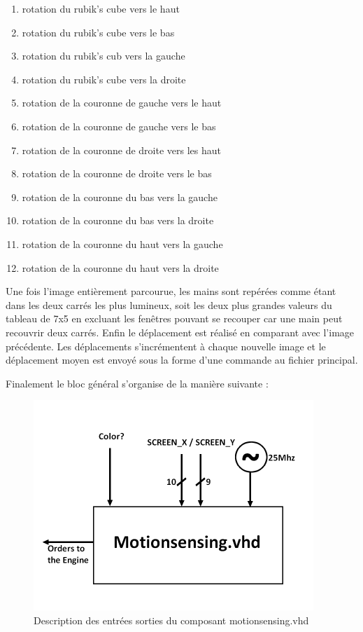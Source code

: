 \documentclass[10pt,a4paper]{report}
\begin{document}
\begin{enumerate}
\item rotation du rubik's cube vers le haut
\item rotation du rubik's cube vers le bas
\item rotation du rubik's cub vers la gauche
\item rotation du rubik's cube vers la droite
\item rotation de la couronne de gauche vers le haut
\item rotation de la couronne de gauche vers le bas
\item rotation de la couronne de droite vers les haut
\item rotation de la couronne de droite vers le bas
\item rotation de la couronne du bas vers la gauche
\item rotation de la couronne du bas vers la droite
\item rotation de la couronne du haut vers la gauche
\item rotation de la couronne du haut vers la droite\\
\end{enumerate}


Une fois l'image entièrement parcourue, les mains sont repérées comme étant dans les deux carrés les plus lumineux, soit les deux plus grandes valeurs du tableau de 7x5 en excluant les fenêtres pouvant se recouper car une main peut recouvrir deux carrés. Enfin le déplacement est réalisé en comparant avec l'image précédente. Les déplacements s'incrémentent à chaque nouvelle image et le déplacement moyen est envoyé sous la forme d'une commande au fichier principal.

Finalement le bloc général s'organise de la manière suivante :

\begin{figure}[!h]
\centering
\includegraphics[width=300pt]{gfx/motionsensing.png}
\caption{Description des entrées sorties du composant motionsensing.vhd}
\end{figure}
\end{document}
